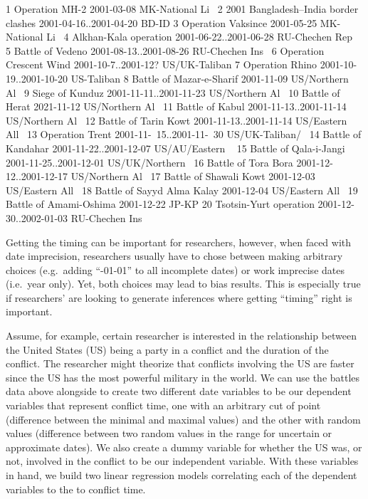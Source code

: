 \documentclass[
]{jss}
\begin{document}
\begin{CodeChunk}
\begin{CodeOutput}
 1 Operation MH-2                       2001-03-08               MK-National Li~
 2 2001 Bangladesh–India border clashes 2001-04-16..2001-04-20   BD-ID          
 3 Operation Vaksince                   2001-05-25               MK-National Li~
 4 Alkhan-Kala operation                2001-06-22..2001-06-28   RU-Chechen Rep~
 5 Battle of Vedeno                     2001-08-13..2001-08-26   RU-Chechen Ins~
 6 Operation Crescent Wind              2001-10-7..2001-12?      US/UK-Taliban  
 7 Operation Rhino                      2001-10-19..2001-10-20   US-Taliban     
 8 Battle of Mazar-e-Sharif             2001-11-09               US/Northern Al~
 9 Siege of Kunduz                      2001-11-11..2001-11-23   US/Northern Al~
10 Battle of Herat                      2021-11-12               US/Northern Al~
11 Battle of Kabul                      2001-11-13..2001-11-14   US/Northern Al~
12 Battle of Tarin Kowt                 2001-11-13..2001-11-14   US/Eastern All~
13 Operation Trent                      2001-11-~15..2001-11-~30 US/UK-Taliban/~
14 Battle of Kandahar                   2001-11-22..2001-12-07   US/AU/Eastern ~
15 Battle of Qala-i-Jangi               2001-11-25..2001-12-01   US/UK/Northern~
16 Battle of Tora Bora                  2001-12-12..2001-12-17   US/Northern Al~
17 Battle of Shawali Kowt               2001-12-03               US/Eastern All~
18 Battle of Sayyd Alma Kalay           2001-12-04               US/Eastern All~
19 Battle of Amami-Oshima               2001-12-22               JP-KP          
20 Tsotsin-Yurt operation               2001-12-30..2002-01-03   RU-Chechen Ins~
\end{CodeOutput}
\end{CodeChunk}

Getting the timing can be important for researchers, however, when faced
with date imprecision, researchers usually have to chose between making
arbitrary choices (e.g.~adding ``-01-01'' to all incomplete dates) or
work imprecise dates (i.e.~year only). Yet, both choices may lead to
bias results. This is especially true if researchers' are looking to
generate inferences where getting ``timing'' right is important.

Assume, for example, certain researcher is interested in the
relationship between the United States (US) being a party in a conflict
and the duration of the conflict. The researcher might theorize that
conflicts involving the US are faster since the US has the most powerful
military in the world. We can use the battles data above alongside
 to create two different date variables to be our
dependent variables that represent conflict time, one with an arbitrary
cut of point (difference between the minimal and maximal values) and the
other with random values (difference between two random values in the
range for uncertain or approximate dates). We also create a dummy
variable for whether the US was, or not, involved in the conflict to be
our independent variable. With these variables in hand, we build two
linear regression models correlating each of the dependent variables to
the to conflict time.
\end{document}
